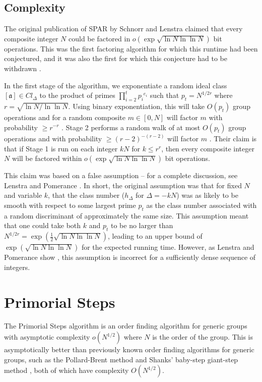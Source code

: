 \documentclass{ucalgthes1}
\theoremstyle{definition}
\newcommand{\aclass}{[\mathfrak a]}
\begin{document}
\subsection{Complexity}

The original publication of SPAR by Schnorr and Lenstra \cite{Schnorr1984} claimed that every composite integer $N$ could be factored in $o\left(\exp\sqrt{\ln N \ln\ln N}\right)$ bit operations.  This was the first factoring algorithm for which this runtime had been conjectured, and it was also the first for which this conjecture had to be withdrawn \cite{Lenstra1992}.

In the first stage of the algorithm, we exponentiate a random ideal class $\aclass \in Cl_\Delta$ to the product of primes $\prod_{i=2}^t {p_i}^{e_i}$ such that $p_t = N^{1/2r}$ where $r = \sqrt{\ln N / \ln \ln N}$.  Using binary exponentiation, this will take $O(p_t)$ group operations and for a random composite $m \in [0, N]$ will factor $m$ with probability $\ge r^{-r}$ \cite[p.290]{Schnorr1984}. Stage 2 performs a random walk of at most $O(p_t)$ group operations and with probability $\ge (r-2)^{-(r-2)}$ will factor $m$ \cite[p.290]{Schnorr1984}.  Their claim is that if Stage 1 is run on each integer $kN$ for $k \le r^r$, then every composite integer $N$ will be factored within $o\left(\exp \sqrt{ \ln N \ln\ln N } \right)$ bit operations.

This claim was based on a false assumption -- for a complete discussion, see Lenstra and Pomerance \cite[\S 11]{Lenstra1992}.  In short, the original assumption was that for fixed $N$ and variable $k$, that the class number ($h_\Delta$ for $\Delta = -kN$) was as likely to be smooth with respect to some largest prime $p_t$ as the class number associated with a random discriminant of approximately the same size.  This assumption meant that one could take both $k$ and $p_t$ to be no larger than $N^{1/2r} = \exp\left(\frac{1}{2}\sqrt{\ln N \ln \ln N}\right)$, leading to an upper bound of $\exp\left(\sqrt{\ln N \ln \ln N}\right)$ for the expected running time.  However, as Lenstra and Pomerance show \cite[\S 11]{Lenstra1992}, this assumption is incorrect for a sufficiently dense sequence of integers.



\bigbreak
\section{Primorial Steps}
\label{sec:primorial}

The Primorial Steps algorithm \cite{Sutherland2007} is an order finding algorithm for generic groups with asymptotic complexity $o(N^{1/2})$ where $N$ is the order of the group.  This is asymptotically better than previously known order finding algorithms for generic groups, such as the Pollard-Brent method \cite{Brent1980} and Shanks' baby-step giant-step method \cite{Shanks1971}, both of which have complexity $O(N^{1/2})$.
\end{document}
